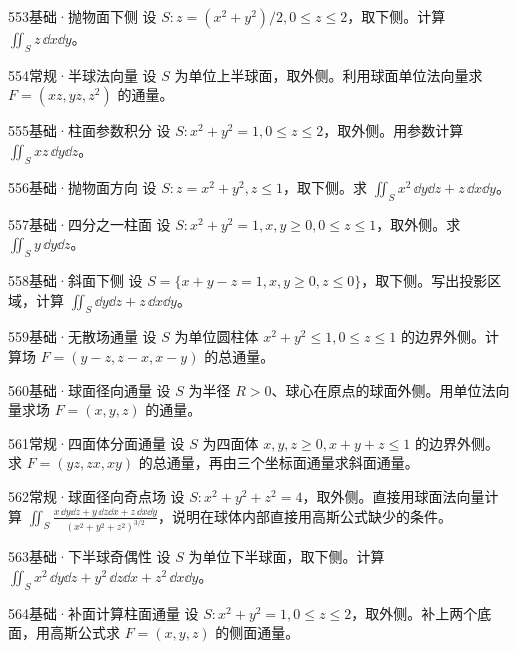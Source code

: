 \begin{exercise}{553}{基础·抛物面下侧}
设 $S:z=(x^2+y^2)/2,0\leq z\leq2$，取下侧。计算 $\iint_Sz\,\dd x\dd y$。
\end{exercise}
\begin{exercise}{554}{常规·半球法向量}
设 $S$ 为单位上半球面，取外侧。利用球面单位法向量求 $F=(xz,yz,z^2)$ 的通量。
\end{exercise}
\begin{exercise}{555}{基础·柱面参数积分}
设 $S:x^2+y^2=1,0\leq z\leq2$，取外侧。用参数计算 $\iint_Sxz\,\dd y\dd z$。
\end{exercise}
\begin{exercise}{556}{基础·抛物面方向}
设 $S:z=x^2+y^2,z\leq1$，取下侧。求 $\iint_Sx^2\,\dd y\dd z+z\,\dd x\dd y$。
\end{exercise}
\begin{exercise}{557}{基础·四分之一柱面}
设 $S:x^2+y^2=1,x,y\geq0,0\leq z\leq1$，取外侧。求 $\iint_Sy\,\dd y\dd z$。
\end{exercise}
\begin{exercise}{558}{基础·斜面下侧}
设 $S=\{x+y-z=1,x,y\geq0,z\leq0\}$，取下侧。写出投影区域，计算 $\iint_S\dd y\dd z+z\,\dd x\dd y$。
\end{exercise}
\begin{exercise}{559}{基础·无散场通量}
设 $S$ 为单位圆柱体 $x^2+y^2\leq1,0\leq z\leq1$ 的边界外侧。计算场 $F=(y-z,z-x,x-y)$ 的总通量。
\end{exercise}
\begin{exercise}{560}{基础·球面径向通量}
设 $S$ 为半径 $R>0$、球心在原点的球面外侧。用单位法向量求场 $F=(x,y,z)$ 的通量。
\end{exercise}
\begin{exercise}{561}{常规·四面体分面通量}
设 $S$ 为四面体 $x,y,z\geq0,x+y+z\leq1$ 的边界外侧。求 $F=(yz,zx,xy)$ 的总通量，再由三个坐标面通量求斜面通量。
\end{exercise}
\begin{exercise}{562}{常规·球面径向奇点场}
设 $S:x^2+y^2+z^2=4$，取外侧。直接用球面法向量计算 $\iint_S\frac{x\,\dd y\dd z+y\,\dd z\dd x+z\,\dd x\dd y}{(x^2+y^2+z^2)^{3/2}}$，说明在球体内部直接用高斯公式缺少的条件。
\end{exercise}
\begin{exercise}{563}{基础·下半球奇偶性}
设 $S$ 为单位下半球面，取下侧。计算 $\iint_Sx^2\,\dd y\dd z+y^2\,\dd z\dd x+z^2\,\dd x\dd y$。
\end{exercise}
\begin{exercise}{564}{基础·补面计算柱面通量}
设 $S:x^2+y^2=1,0\leq z\leq2$，取外侧。补上两个底面，用高斯公式求 $F=(x,y,z)$ 的侧面通量。
\end{exercise}
